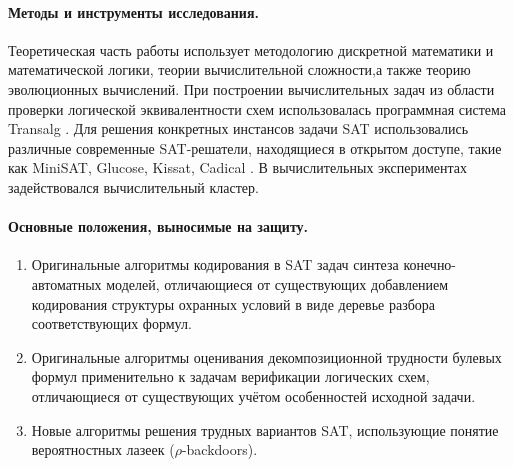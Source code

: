 \paragraph*{Методы и инструменты исследования.}
%
Теоретическая часть работы использует методологию дискретной математики и математической логики, теории вычислительной сложности,а также теорию эволюционных вычислений.
 
При построении вычислительных задач из области проверки логической эквивалентности схем использовалась программная система Transalg .
Для решения конкретных инстансов задачи SAT использовались различные современные SAT-решатели, находящиеся в открытом доступе, такие как MiniSAT, Glucose, Kissat, Cadical .
В вычислительных экспериментах задействовался вычислительный кластер.


\paragraph*{Основные положения, выносимые на защиту.}
%
\begin{enumerate}[beginpenalty=10000]
    \item Оригинальные алгоритмы кодирования в SAT задач синтеза конечно-автоматных моделей, отличающиеся от существующих добавлением кодирования структуры охранных условий в виде деревье разбора соответствующих формул.

    \item Оригинальные алгоритмы оценивания декомпозиционной трудности булевых формул применительно к задачам верификации логических схем, отличающиеся от существующих учётом особенностей исходной задачи.

    \item Новые алгоритмы решения трудных вариантов SAT, использующие понятие вероятностных лазеек ($\rho$-backdoors).


\end{enumerate}


